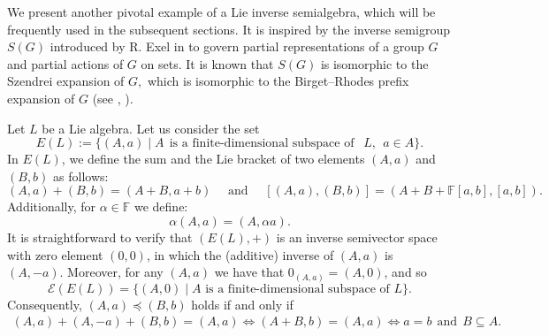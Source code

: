 \documentclass{amsart}
\newcommand{\E}{\mathcal{E}}
\newcommand{\F}{\mathbb{F}}
\newcommand{\0}{{\vartheta}}
\theoremstyle{definition}
\theoremstyle{remark}
\numberwithin{equation}{section}
\newtheorem*{Theorem A}{\textbf{Theorem A}}
\newtheorem*{Corollary E}{\textbf{Corollary E}}
\newtheorem*{Corollary F}{\textbf{Corollary F}}
\newtheorem*{Theorem B}{\textbf{Theorem B}}
\newtheorem*{Theorem C}{\textbf{Theorem C}}
\newtheorem*{Theorem D}{\textbf{Theorem B}}
\newtheorem*{p a}{\textbf{Proof of  Theorem A}}
\newtheorem*{p b}{\textbf{Proof of Theorem B}}
\newtheorem*{p c}{\textbf{Proof of  Theorem C}}
\newtheorem*{p d}{\textbf{Proof of  Theorem D}}
\begin{document}
We present another pivotal example of a Lie inverse semialgebra, which will be frequently used in the subsequent sections.  It  is inspired by the inverse semigroup $S(G)$  introduced by R. Exel  in  \cite{Exel1998} to govern partial  representations of a group $G$ and partial actions of $G$ on sets.  It is known that $S(G)$ is isomorphic to the Szendrei expansion of $G,$ which is isomorphic to  the Birget–Rhodes prefix expansion of $G$ (see \cite{KL}, \cite{Szendrei}).

Let $L$ be a Lie algebra.  Let us consider the set 
    $$E(L):=\{(A,a) \mid A ~~\text{is a finite-dimensional subspace of }~~L,~~ a\in A\}.$$
In $E(L)$, we define the sum and the Lie bracket of two elements $(A,a)$ and $(B,b)$ as follows: 
$$(A,a)+(B,b)=(A+B,a+b) \quad \mbox{ and } \quad [(A,a), (B,b)]=(A+B+\mathbb{F}[a,b],[a,b]).$$
Additionally, for $\alpha\in \F$ we define:
$$\alpha (A,a)=(A,\alpha a).$$ 
It is straightforward to verify that $(E(L),+)$ is an inverse semivector  space with zero element  $(0,0)$, in which the (additive) inverse of $(A,a)$
is  $(A,-a).$  Moreover, for any $(A,a)$ we have that $0_{(A,a)}=(A,0)$, and so $$\E(E(L))=\{(A,0)\mid A \mbox{ is a finite-dimensional subspace of } L \}.$$ Consequently, $ (A,a)\preceq (B,b)$ holds if and only if 
 \begin{align*}
 (A,a)+ (A,-a)+(B,b)=(A,a)  \Longleftrightarrow (A+ B,b)=(A,a) \Longleftrightarrow a=b ~~\text{and}~~ B\subseteq A.
 \end{align*}
\end{document}
